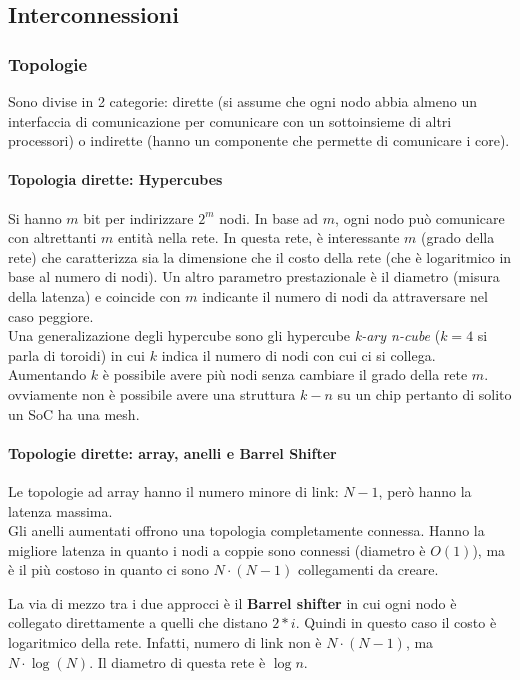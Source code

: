 \documentclass{article}
\begin{document}
\subsection{Interconnessioni}

\subsubsection{Topologie}
Sono divise in 2 categorie: dirette (si assume che ogni nodo abbia almeno un interfaccia di comunicazione per comunicare con un sottoinsieme di altri processori) o indirette (hanno un componente che permette di comunicare i core).
\paragraph{Topologia dirette: Hypercubes}
Si hanno $m$ bit per indirizzare $2^m$ nodi. In base ad $m$, ogni nodo può comunicare con altrettanti $m$ entità nella rete. In questa rete, è interessante $m$ (grado della rete) che caratterizza sia la dimensione che il costo della rete (che è logaritmico in base al numero di nodi). Un altro parametro prestazionale è il diametro (misura della latenza) e coincide con $m$ indicante il numero di nodi da attraversare nel caso peggiore.\\
Una generalizazione degli hypercube sono gli hypercube \textit{k-ary n-cube} ($k=4$ si parla di toroidi) in cui $k$ indica il numero di nodi con cui ci si collega. Aumentando $k$ è possibile avere più nodi senza cambiare il grado della rete $m$. ovviamente non è possibile avere una struttura $k-n$ su un chip pertanto di solito un SoC ha una mesh.

\paragraph{Topologie dirette: array, anelli e Barrel Shifter}
Le topologie ad array hanno il numero minore di link: $N-1$, però hanno la latenza massima.\\

Gli anelli aumentati offrono una topologia completamente connessa. Hanno la migliore latenza in quanto i nodi a coppie sono connessi (diametro è $O(1)$), ma è il più costoso in quanto ci sono $N\cdot(N-1)$ collegamenti da creare.

La via di mezzo tra i due approcci è il \textbf{Barrel shifter} in cui ogni nodo è collegato direttamente a quelli che distano $2*i$. Quindi in questo caso il costo è logaritmico della rete. Infatti, numero di link non è $N\cdot (N-1)$, ma $N \cdot \log (N)$. Il diametro di questa rete è $\log n$.
\end{document}
